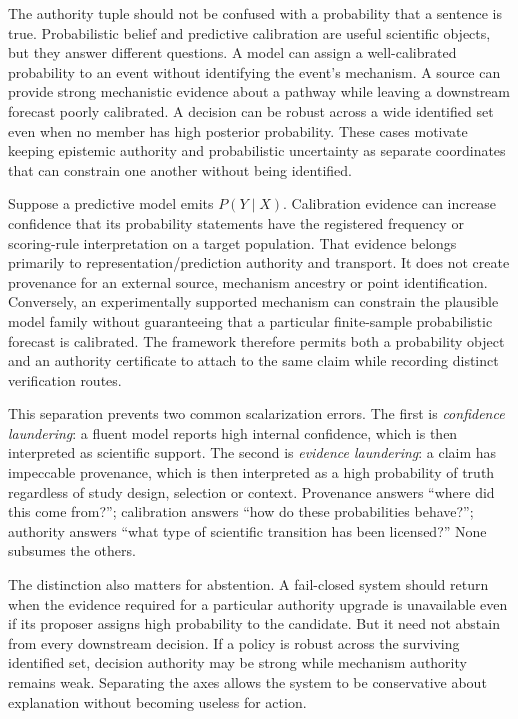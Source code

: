 The authority tuple should not be confused with a probability that a sentence is true. Probabilistic belief and predictive calibration are useful scientific objects, but they answer different questions. A model can assign a well-calibrated probability to an event without identifying the event's mechanism. A source can provide strong mechanistic evidence about a pathway while leaving a downstream forecast poorly calibrated. A decision can be robust across a wide identified set even when no member has high posterior probability. These cases motivate keeping epistemic authority and probabilistic uncertainty as separate coordinates that can constrain one another without being identified.

Suppose a predictive model emits \(P(Y\mid X)\). Calibration evidence can increase confidence that its probability statements have the registered frequency or scoring-rule interpretation on a target population. That evidence belongs primarily to representation/prediction authority and transport. It does not create provenance for an external source, mechanism ancestry or point identification. Conversely, an experimentally supported mechanism can constrain the plausible model family without guaranteeing that a particular finite-sample probabilistic forecast is calibrated. The framework therefore permits both a probability object and an authority certificate to attach to the same claim while recording distinct verification routes.

This separation prevents two common scalarization errors. The first is \emph{confidence laundering}: a fluent model reports high internal confidence, which is then interpreted as scientific support. The second is \emph{evidence laundering}: a claim has impeccable provenance, which is then interpreted as a high probability of truth regardless of study design, selection or context. Provenance answers ``where did this come from?''; calibration answers ``how do these probabilities behave?''; authority answers ``what type of scientific transition has been licensed?'' None subsumes the others.

The distinction also matters for abstention. A fail-closed system should return \CannotCheck{} when the evidence required for a particular authority upgrade is unavailable even if its proposer assigns high probability to the candidate. But it need not abstain from every downstream decision. If a policy is robust across the surviving identified set, decision authority may be strong while mechanism authority remains weak. Separating the axes allows the system to be conservative about explanation without becoming useless for action.

